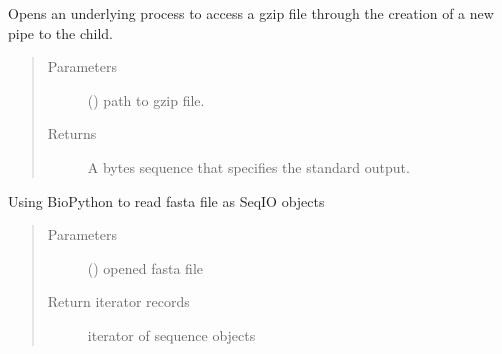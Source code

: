 \documentclass[letterpaper,10pt,english]{sphinxmanual}
\begin{document}

\begin{fulllineitems}
\label{\detokenize{_autosummary/graphdb_builder:graphdb_builder.builder_utils.read_gzipped_file}}
Opens an underlying process to access a gzip file through the creation of a new pipe to the child.
\begin{quote}\begin{description}
\item[{Parameters}] \leavevmode
{} () \textendash{} path to gzip file.

\item[{Returns}] \leavevmode
A bytes sequence that specifies the standard output.

\end{description}\end{quote}

\end{fulllineitems}


\begin{fulllineitems}
\label{\detokenize{_autosummary/graphdb_builder:graphdb_builder.builder_utils.parse_fasta}}
Using BioPython to read fasta file as SeqIO objects
\begin{quote}\begin{description}
\item[{Parameters}] \leavevmode
{} () \textendash{} opened fasta file

\item[{Return iterator records}] \leavevmode
iterator of sequence objects

\end{description}\end{quote}

\end{fulllineitems}
\end{document}

